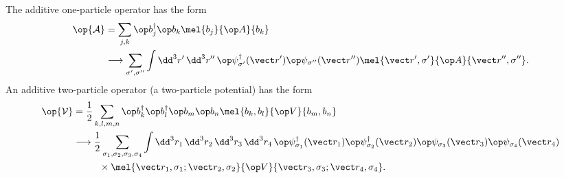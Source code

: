 The additive one-particle operator has the form
\begin{align*}
\op{\mathcal A}&=\sum_{j,k}\op b_j^\dagger\op b_k\mel{b_j}{\op A}{b_k}\\
&\longrightarrow\sum_{\sigma',\sigma''}\int\dd^3r'\,\dd^3r''\,
\op\psi_{\sigma'}^\dagger(\vect r')\op\psi_{\sigma''}(\vect r'')
\mel{\vect r',\sigma'}{\op A}{\vect r'',\sigma''}.
\end{align*}
An additive two-particle operator (a two-particle potential) has the form
\begin{align*}
\op{\mathcal V}
&=\frac12\sum_{k,l,m,n}\op b_k^\dagger\op b_l^\dagger\op b_m\op b_n
\mel{b_k,b_l}{\op V}{b_m,b_n}\\
&\longrightarrow\frac12\sum_{\sigma_1,\sigma_2,\sigma_3,\sigma_4}
\int\dd^3r_1\,\dd^3r_2\,\dd^3r_3\,\dd^3r_4\,
\op\psi_{\sigma_1}^\dagger(\vect r_1)
\op\psi_{\sigma_2}^\dagger(\vect r_2)
\op\psi_{\sigma_3}(\vect r_3)
\op\psi_{\sigma_4}(\vect r_4)\\
&\hspace{2.7em}\times
\mel{\vect r_1,\sigma_1;\vect r_2,\sigma_2}{\op V}
{\vect r_3,\sigma_3;\vect r_4,\sigma_4}.
\end{align*}

